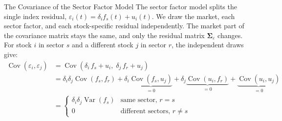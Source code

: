 \documentclass[aspectratio=169,11pt]{beamer}
\begin{document}
\begin{frame}{The Covariance of the Sector Factor Model}
  The sector factor model splits the single index residual, $\varepsilon_i(t)=\delta_i f_s(t)+u_i(t)$.
  We draw the market, each sector factor, and each stock-specific residual independently. The market
  part of the covariance matrix stays the same, and only the residual matrix $\symbf{\Sigma}_\varepsilon$
  changes. For stock $i$ in sector $s$ and a different stock $j$ in sector $r$, the independent
  draws give:
  \begin{align*}
    \operatorname{Cov}(\varepsilon_{i},\varepsilon_{j}) &= \operatorname{Cov}\left(\delta_{i}\,f_{s}+u_{i},\;\delta_{j}\,f_{r}+u_{j}\right)\\
    &= \delta_{i}\delta_{j}\operatorname{Cov}(f_{s},f_{r})+\delta_{i}\underbrace{\operatorname{Cov}(f_{s},u_{j})}_{=0}+\delta_{j}\underbrace{\operatorname{Cov}(u_{i},f_{r})}_{=0}+\underbrace{\operatorname{Cov}(u_{i},u_{j})}_{=0}\\
    &= \begin{cases}\delta_{i}\delta_{j}\operatorname{Var}(f_{s}) & \text{same sector, } r=s\\ 0 & \text{different sectors, } r\neq s\end{cases}
  \end{align*}
\end{frame}
\end{document}
